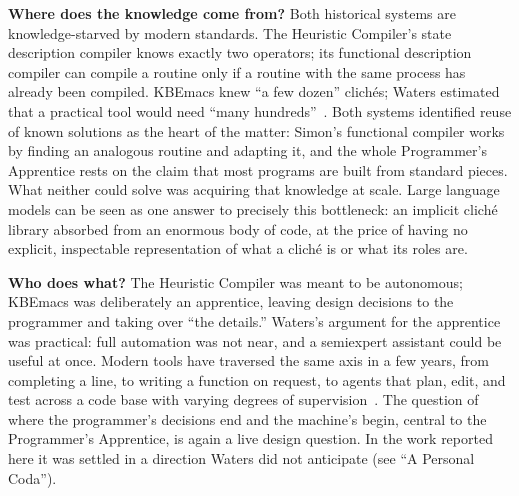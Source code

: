 \documentclass[11pt]{article}
\begin{document}
\textbf{Where does the knowledge come from?} Both historical systems
are knowledge-starved by modern standards. The Heuristic Compiler's
state description compiler knows exactly two operators; its functional
description compiler can compile a routine only if a routine with the
same process has already been compiled. KBEmacs knew ``a few dozen''
clich\'es; Waters estimated that a practical tool would need ``many
hundreds''~\cite[p.~55]{waters1986aimag}. Both systems identified reuse
of known solutions as the heart of the matter: Simon's functional
compiler works by finding an analogous routine and adapting it, and the
whole Programmer's Apprentice rests on the claim that most programs are
built from standard pieces. What neither could solve was acquiring that
knowledge at scale. Large language models can be seen as one answer to
precisely this bottleneck: an implicit clich\'e library absorbed from
an enormous body of code, at the price of having no explicit, inspectable
representation of what a clich\'e is or what its roles are.

\textbf{Who does what?} The Heuristic Compiler was meant to be
autonomous; KBEmacs was deliberately an apprentice, leaving design
decisions to the programmer and taking over ``the details.'' Waters's
argument for the apprentice was practical: full automation was not
near, and a semiexpert assistant could be useful at once. Modern tools
have traversed the same axis in a few years, from completing a line, to
writing a function on request, to agents that plan, edit, and test
across a code base with varying degrees of
supervision~\cite{jimenez2024swebench}. The question of where the
programmer's decisions end and the machine's begin, central to the
Programmer's Apprentice, is again a live design question. In the work
reported here it was settled in a direction Waters did not anticipate
(see ``A Personal Coda'').
\end{document}
